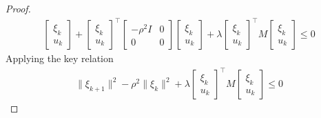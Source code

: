 \documentclass[11pt]{elegantbook}
\begin{document}
\begin{proof}
\begin{equation}
\begin{aligned}
            \left[\begin{array}{l}
                \xi_{k} \\
                u_{k}
            \end{array}\right] + \left[\begin{array}{l}
                \xi_{k} \\
                u_{k}
            \end{array}\right]^{\top}
            \left[\begin{array}{cc}
                -\rho^2I & 0 \\
                0 & 0
                \end{array}\right]
                \left[\begin{array}{l}
                    \xi_{k} \\
                    u_{k}
                \end{array}\right]+
                \lambda \left[\begin{array}{l}
                    \xi_{k} \\
                    u_{k}
                \end{array}\right]^{\top}
                M
                    \left[\begin{array}{l}
                        \xi_{k} \\
                        u_{k}
                    \end{array}\right]\leq 0
    \end{aligned}
    \nonumber
\end{equation}
Applying the key relation
\begin{equation}
    \begin{aligned}
        \|\xi_{k+1}\|^2-\rho^2\|\xi_k\|^2+\lambda\left[\begin{array}{l}
            \xi_{k} \\
            u_{k}
        \end{array}\right]^{\top}
        M
            \left[\begin{array}{l}
                \xi_{k} \\
                u_{k}
            \end{array}\right]\leq 0
    \end{aligned}
    \nonumber
\end{equation}


\end{proof}
\end{document}
